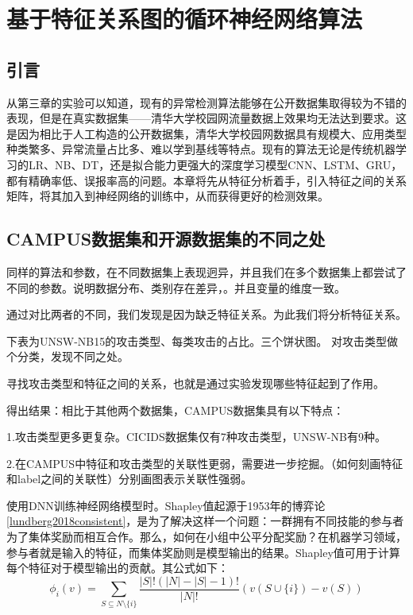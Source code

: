 
\chapter{基于特征关系图的循环神经网络算法}
\section{引言}
从第三章的实验可以知道，现有的异常检测算法能够在公开数据集取得较为不错的表现，但是在真实数据集——清华大学校园网流量数据上效果均无法达到要求。这是因为相比于人工构造的公开数据集，清华大学校园网数据具有规模大、应用类型种类繁多、异常流量占比多、难以学到基线等特点。现有的算法无论是传统机器学习的LR、NB、DT，还是拟合能力更强大的深度学习模型CNN、LSTM、GRU，都有精确率低、误报率高的问题。本章将先从特征分析着手，引入特征之间的关系矩阵，将其加入到神经网络的训练中，从而获得更好的检测效果。

\section{CAMPUS数据集和开源数据集的不同之处}
同样的算法和参数，在不同数据集上表现迥异，并且我们在多个数据集上都尝试了不同的参数。说明数据分布、类别存在差异，。并且变量的维度一致。

通过对比两者的不同，我们发现是因为缺乏特征关系。为此我们将分析特征关系。

下表为UNSW-NB15的攻击类型、每类攻击的占比。三个饼状图。
对攻击类型做个分类，发现不同之处。

寻找攻击类型和特征之间的关系，也就是通过实验发现哪些特征起到了作用。

得出结果：相比于其他两个数据集，CAMPUS数据集具有以下特点：

1.攻击类型更多更复杂。CICIDS数据集仅有7种攻击类型，UNSW-NB有9种。

2.在CAMPUS中特征和攻击类型的关联性更弱，需要进一步挖掘。（如何刻画特征和label之间的关联性）分别画图表示关联性强弱。


使用DNN训练神经网络模型时。Shapley值起源于1953年的博弈论\ref{lundberg2018consistent}，是为了解决这样一个问题：一群拥有不同技能的参与者为了集体奖励而相互合作。那么，如何在小组中公平分配奖励？在机器学习领域，参与者就是输入的特征，而集体奖励则是模型输出的结果。Shapley值可用于计算每个特征对于模型输出的贡献。其公式如下： 
\begin{equation}
  \phi_i(v) = \sum_{S\subseteq N \setminus \{i\}} \frac{|S|! (|N| - |S| - 1)!}{|N|!}(v(S \cup \{i\}) - v(S))
\end{equation}

